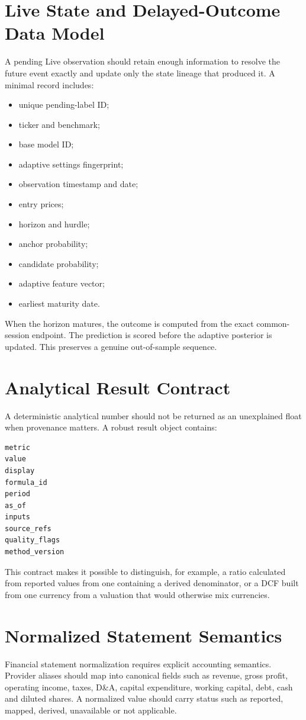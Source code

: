 \documentclass[11pt]{article}
\begin{document}
\section{Live State and Delayed-Outcome Data Model}
A pending Live observation should retain enough information to resolve the future event exactly and update only the state lineage that produced it. A minimal record includes:
\begin{itemize}[itemsep=0.15em]
\item unique pending-label ID;
\item ticker and benchmark;
\item base model ID;
\item adaptive settings fingerprint;
\item observation timestamp and date;
\item entry prices;
\item horizon and hurdle;
\item anchor probability;
\item candidate probability;
\item adaptive feature vector;
\item earliest maturity date.
\end{itemize}

When the horizon matures, the outcome is computed from the exact common-session endpoint. The prediction is scored before the adaptive posterior is updated. This preserves a genuine out-of-sample sequence.

\section{Analytical Result Contract}
A deterministic analytical number should not be returned as an unexplained float when provenance matters. A robust result object contains:
\begin{verbatim}
metric
value
display
formula_id
period
as_of
inputs
source_refs
quality_flags
method_version
\end{verbatim}
This contract makes it possible to distinguish, for example, a ratio calculated from reported values from one containing a derived denominator, or a DCF built from one currency from a valuation that would otherwise mix currencies.

\section{Normalized Statement Semantics}
Financial statement normalization requires explicit accounting semantics. Provider aliases should map into canonical fields such as revenue, gross profit, operating income, taxes, D\&A, capital expenditure, working capital, debt, cash and diluted shares. A normalized value should carry status such as reported, mapped, derived, unavailable or not applicable.
\end{document}
